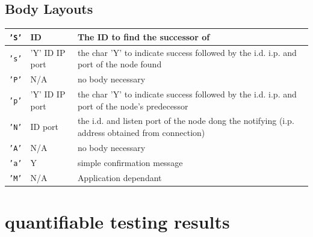 \documentclass{article}
\begin{document}
\subsection{Body Layouts}
\begin{tabular}{|l | l | L|}
\hline
\texttt{'S'} & ID & The ID to find the successor of\\\hline
\texttt{'s'} & 'Y' ID IP port & the char 'Y' to indicate success followed by the i.d. i.p. and port of the node found\\\hline
\texttt{'P'} & N/A & no body necessary\\\hline
\texttt{'p'} & 'Y' ID IP port & the char 'Y' to indicate success followed by the i.d. i.p. and port of the node's predecessor \\\hline
\texttt{'N'} & ID port & the i.d. and listen port of the node dong the notifying (i.p. address obtained from connection) \\\hline
\texttt{'A'} & N/A & no body necessary\\\hline
\texttt{'a'} & Y & simple confirmation message\\\hline
\texttt{'M'} & N/A & Application dependant\\\hline
\end{tabular}

\section{quantifiable testing results}
\end{document}
